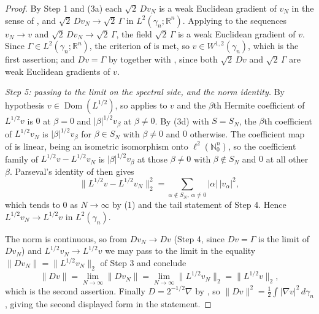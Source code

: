 \begin{proof}
By Step 1 and (3a) each $\sqrt2\,Dv_N$ is a weak Euclidean gradient of $v_N$ in
the sense of , and $\sqrt2\,Dv_N \to \sqrt2\,\Gamma$ in
$L^2(\gamma_n;\mathbb{R}^n)$.  Applying  to the
sequences $v_N \to v$ and $\sqrt2\,Dv_N \to \sqrt2\,\Gamma$, the field
$\sqrt2\,\Gamma$ is a weak Euclidean gradient of $v$.  Since
$\Gamma \in L^2(\gamma_n;\mathbb{R}^n)$, the criterion of  is
met, so $v \in W^{1,2}(\gamma_n)$, which is the first assertion; and $Dv = \Gamma$
by  together with , since both
$\sqrt2\,Dv$ and $\sqrt2\,\Gamma$ are weak Euclidean gradients of $v$.

\emph{Step 5: passing to the limit on the spectral side, and the norm identity.}
By hypothesis $v \in \operatorname{Dom}(L^{1/2})$, so  applies to
$v$ and the $\beta$th Hermite coefficient of $L^{1/2}v$ is $0$ at $\beta = 0$ and
$|\beta|^{1/2}v_\beta$ at $\beta \neq 0$.  By (3d) with $S = S_N$, the $\beta$th
coefficient of $L^{1/2}v_N$ is $|\beta|^{1/2}v_\beta$ for $\beta \in S_N$ with
$\beta \neq 0$ and $0$ otherwise.  The coefficient map of 
is linear, being an isometric isomorphism onto $\ell^2(\mathbb{N}_0^n)$, so the
coefficient family of $L^{1/2}v - L^{1/2}v_N$ is $|\beta|^{1/2}v_\beta$ at those
$\beta \neq 0$ with $\beta \notin S_N$ and $0$ at all other $\beta$.  Parseval's
identity of  then gives
\[
  \|L^{1/2}v - L^{1/2}v_N\|_2^2
    = \sum_{\alpha \notin S_N,\ \alpha \neq 0} |\alpha|\,|v_\alpha|^2 ,
\]
which tends to $0$ as $N \to \infty$ by (1) and the tail statement of Step 4.
Hence $L^{1/2}v_N \to L^{1/2}v$ in $L^2(\gamma_n)$.

The norm is continuous, so from $Dv_N \to Dv$ (Step 4, since $Dv = \Gamma$ is the
limit of $Dv_N$) and $L^{1/2}v_N \to L^{1/2}v$ we may pass to the limit in the
equality $\|Dv_N\| = \|L^{1/2}v_N\|_2$ of Step 3 and conclude
\[
  \|Dv\| = \lim_{N\to\infty}\|Dv_N\| = \lim_{N\to\infty}\|L^{1/2}v_N\|_2
    = \|L^{1/2}v\|_2 ,
\]
which is the second assertion.  Finally $D = 2^{-1/2}\nabla$ by ,
so $\|Dv\|^2 = \tfrac12\int|\nabla v|^2\,d\gamma_n$, giving the second displayed
form in the statement.
\end{proof}
